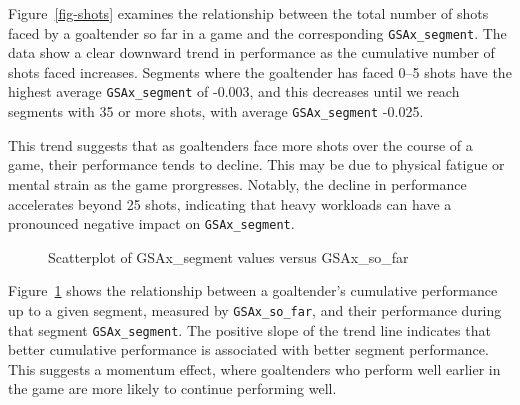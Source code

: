 \documentclass[
  letterpaper,
  DIV=11,
  numbers=noendperiod]{scrartcl}
\begin{document}
Figure~\ref{fig-shots} examines the relationship between the total
number of shots faced by a goaltender so far in a game and the
corresponding \texttt{GSAx\_segment}. The data show a clear downward
trend in performance as the cumulative number of shots faced increases.
Segments where the goaltender has faced 0--5 shots have the highest
average \texttt{GSAx\_segment} of -0.003, and this decreases until we
reach segments with 35 or more shots, with average
\texttt{GSAx\_segment} -0.025.

This trend suggests that as goaltenders face more shots over the course
of a game, their performance tends to decline. This may be due to
physical fatigue or mental strain as the game prorgresses. Notably, the
decline in performance accelerates beyond 25 shots, indicating that
heavy workloads can have a pronounced negative impact on
\texttt{GSAx\_segment}.

\begin{figure}


\caption{\label{fig-sofar}Scatterplot of GSAx\_segment values versus
GSAx\_so\_far}

\end{figure}%

Figure~\ref{fig-sofar} shows the relationship between a goaltender's
cumulative performance up to a given segment, measured by
\texttt{GSAx\_so\_far}, and their performance during that segment
\texttt{GSAx\_segment}. The positive slope of the trend line indicates
that better cumulative performance is associated with better segment
performance. This suggests a momentum effect, where goaltenders who
perform well earlier in the game are more likely to continue performing
well.
\end{document}
